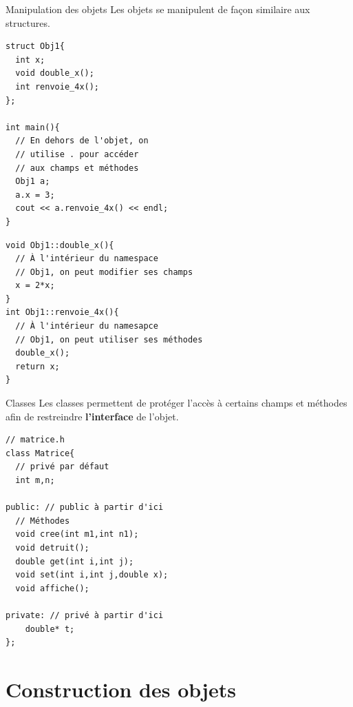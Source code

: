 \begin{frame}[fragile=singleslide]{Manipulation des objets}
Les objets se manipulent de façon similaire aux structures.

\begin{minipage}{0.50\linewidth}
    
        \begin{verbatim}
struct Obj1{
  int x;
  void double_x();
  int renvoie_4x();
};

int main(){
  // En dehors de l'objet, on
  // utilise . pour accéder
  // aux champs et méthodes
  Obj1 a;
  a.x = 3;
  cout << a.renvoie_4x() << endl;
}
        \end{verbatim}
    
\end{minipage}
\hfill
\begin{minipage}{0.48\linewidth}
        \begin{verbatim}
void Obj1::double_x(){
  // À l'intérieur du namespace
  // Obj1, on peut modifier ses champs
  x = 2*x;
}
int Obj1::renvoie_4x(){
  // À l'intérieur du namesapce
  // Obj1, on peut utiliser ses méthodes
  double_x();
  return x;
}
        \end{verbatim}
\end{minipage}
\end{frame}
\begin{frame}[fragile=singleslide]{Classes}
Les classes permettent de protéger l'accès à certains champs et méthodes afin de restreindre \textbf{l'interface} de l'objet.

    \begin{verbatim}
// matrice.h
class Matrice{
  // privé par défaut
  int m,n;

public: // public à partir d'ici
  // Méthodes
  void cree(int m1,int n1);
  void detruit();
  double get(int i,int j);
  void set(int i,int j,double x);
  void affiche();

private: // privé à partir d'ici
    double* t;
};
    \end{verbatim}
\end{frame}

\section{Construction des objets}

